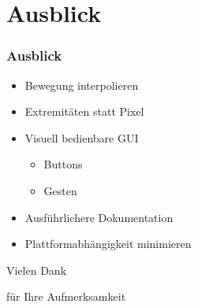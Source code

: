 \documentclass[compress]{beamer}
\begin{document}
\section{Ausblick}

\begin{frame}
\frametitle{Ausblick}
\begin{itemize}
	\item Bewegung interpolieren
	\item Extremitäten statt Pixel
	\item Visuell bedienbare GUI
	\begin{itemize}
		\item Buttons
		\item Gesten
	\end{itemize}
	\item Ausführlichere Dokumentation
	\item Plattformabhängigkeit minimieren
\end{itemize}
\end{frame}

\begin{frame}
\Huge
\centerline{Vielen Dank}
\centerline{für Ihre Aufmerksamkeit}
\end{frame}
\end{document}

